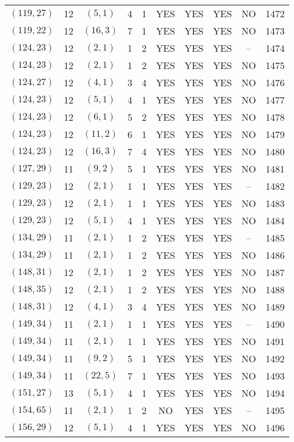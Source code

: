 \begin{longtable}{|c|c|c|c|c|c|c|c|c|c|}
$(119, 27)$ & 12 & $(5, 1)$ & 4 & 1 & YES & YES & YES & NO & 1472\\
$(119, 22)$ & 12 & $(16, 3)$ & 7 & 1 & YES & YES & YES & NO & 1473\\
$(124, 23)$ & 12 & $(2, 1)$ & 1 & 2 & YES & YES & YES & -- & 1474\\
$(124, 23)$ & 12 & $(2, 1)$ & 1 & 2 & YES & YES & YES & NO & 1475\\
$(124, 27)$ & 12 & $(4, 1)$ & 3 & 4 & YES & YES & YES & NO & 1476\\
$(124, 23)$ & 12 & $(5, 1)$ & 4 & 1 & YES & YES & YES & NO & 1477\\
$(124, 23)$ & 12 & $(6, 1)$ & 5 & 2 & YES & YES & YES & NO & 1478\\
$(124, 23)$ & 12 & $(11, 2)$ & 6 & 1 & YES & YES & YES & NO & 1479\\
$(124, 23)$ & 12 & $(16, 3)$ & 7 & 4 & YES & YES & YES & NO & 1480\\
$(127, 29)$ & 11 & $(9, 2)$ & 5 & 1 & YES & YES & YES & NO & 1481\\
$(129, 23)$ & 12 & $(2, 1)$ & 1 & 1 & YES & YES & YES & -- & 1482\\
$(129, 23)$ & 12 & $(2, 1)$ & 1 & 1 & YES & YES & YES & NO & 1483\\
$(129, 23)$ & 12 & $(5, 1)$ & 4 & 1 & YES & YES & YES & NO & 1484\\
$(134, 29)$ & 11 & $(2, 1)$ & 1 & 2 & YES & YES & YES & -- & 1485\\
$(134, 29)$ & 11 & $(2, 1)$ & 1 & 2 & YES & YES & YES & NO & 1486\\
$(148, 31)$ & 12 & $(2, 1)$ & 1 & 2 & YES & YES & YES & NO & 1487\\
$(148, 35)$ & 12 & $(2, 1)$ & 1 & 2 & YES & YES & YES & NO & 1488\\
$(148, 31)$ & 12 & $(4, 1)$ & 3 & 4 & YES & YES & YES & NO & 1489\\
$(149, 34)$ & 11 & $(2, 1)$ & 1 & 1 & YES & YES & YES & -- & 1490\\
$(149, 34)$ & 11 & $(2, 1)$ & 1 & 1 & YES & YES & YES & NO & 1491\\
$(149, 34)$ & 11 & $(9, 2)$ & 5 & 1 & YES & YES & YES & NO & 1492\\
$(149, 34)$ & 11 & $(22, 5)$ & 7 & 1 & YES & YES & YES & NO & 1493\\
$(151, 27)$ & 13 & $(5, 1)$ & 4 & 1 & YES & YES & YES & NO & 1494\\
$(154, 65)$ & 11 & $(2, 1)$ & 1 & 2 & NO & YES & YES & -- & 1495\\
$(156, 29)$ & 12 & $(5, 1)$ & 4 & 1 & YES & YES & YES & NO & 1496\\

\end{longtable}
